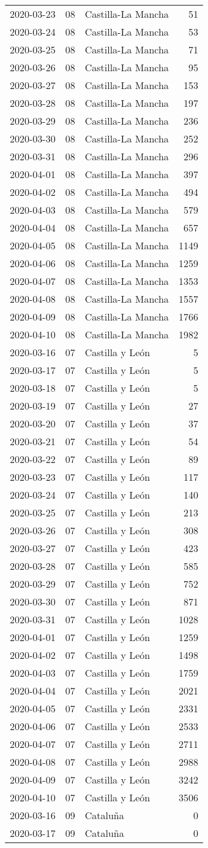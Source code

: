 \documentclass[
]{article}
\begin{document}
\begin{longtable}[]{@{}lllr@{}}
2020-03-23 & 08 & Castilla-La Mancha & 51\tabularnewline
2020-03-24 & 08 & Castilla-La Mancha & 53\tabularnewline
2020-03-25 & 08 & Castilla-La Mancha & 71\tabularnewline
2020-03-26 & 08 & Castilla-La Mancha & 95\tabularnewline
2020-03-27 & 08 & Castilla-La Mancha & 153\tabularnewline
2020-03-28 & 08 & Castilla-La Mancha & 197\tabularnewline
2020-03-29 & 08 & Castilla-La Mancha & 236\tabularnewline
2020-03-30 & 08 & Castilla-La Mancha & 252\tabularnewline
2020-03-31 & 08 & Castilla-La Mancha & 296\tabularnewline
2020-04-01 & 08 & Castilla-La Mancha & 397\tabularnewline
2020-04-02 & 08 & Castilla-La Mancha & 494\tabularnewline
2020-04-03 & 08 & Castilla-La Mancha & 579\tabularnewline
2020-04-04 & 08 & Castilla-La Mancha & 657\tabularnewline
2020-04-05 & 08 & Castilla-La Mancha & 1149\tabularnewline
2020-04-06 & 08 & Castilla-La Mancha & 1259\tabularnewline
2020-04-07 & 08 & Castilla-La Mancha & 1353\tabularnewline
2020-04-08 & 08 & Castilla-La Mancha & 1557\tabularnewline
2020-04-09 & 08 & Castilla-La Mancha & 1766\tabularnewline
2020-04-10 & 08 & Castilla-La Mancha & 1982\tabularnewline
2020-03-16 & 07 & Castilla y León & 5\tabularnewline
2020-03-17 & 07 & Castilla y León & 5\tabularnewline
2020-03-18 & 07 & Castilla y León & 5\tabularnewline
2020-03-19 & 07 & Castilla y León & 27\tabularnewline
2020-03-20 & 07 & Castilla y León & 37\tabularnewline
2020-03-21 & 07 & Castilla y León & 54\tabularnewline
2020-03-22 & 07 & Castilla y León & 89\tabularnewline
2020-03-23 & 07 & Castilla y León & 117\tabularnewline
2020-03-24 & 07 & Castilla y León & 140\tabularnewline
2020-03-25 & 07 & Castilla y León & 213\tabularnewline
2020-03-26 & 07 & Castilla y León & 308\tabularnewline
2020-03-27 & 07 & Castilla y León & 423\tabularnewline
2020-03-28 & 07 & Castilla y León & 585\tabularnewline
2020-03-29 & 07 & Castilla y León & 752\tabularnewline
2020-03-30 & 07 & Castilla y León & 871\tabularnewline
2020-03-31 & 07 & Castilla y León & 1028\tabularnewline
2020-04-01 & 07 & Castilla y León & 1259\tabularnewline
2020-04-02 & 07 & Castilla y León & 1498\tabularnewline
2020-04-03 & 07 & Castilla y León & 1759\tabularnewline
2020-04-04 & 07 & Castilla y León & 2021\tabularnewline
2020-04-05 & 07 & Castilla y León & 2331\tabularnewline
2020-04-06 & 07 & Castilla y León & 2533\tabularnewline
2020-04-07 & 07 & Castilla y León & 2711\tabularnewline
2020-04-08 & 07 & Castilla y León & 2988\tabularnewline
2020-04-09 & 07 & Castilla y León & 3242\tabularnewline
2020-04-10 & 07 & Castilla y León & 3506\tabularnewline
2020-03-16 & 09 & Cataluña & 0\tabularnewline
2020-03-17 & 09 & Cataluña & 0\tabularnewline

\end{longtable}
\end{document}
